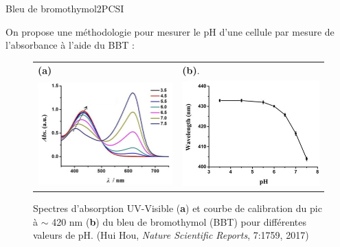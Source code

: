 \begin{exercise}{Bleu de bromothymol}{2}{PCSI}
\begin{questions}
\begin{EnvUplevel}
   On propose une méthodologie pour mesurer le pH d'une cellule par mesure de l'absorbance à l'aide du BBT :
    \begin{figure}[H]
        \centering
        \begin{tabularx}{\linewidth}{XX}
            \small{\textbf{(a)}} & \small{\textbf{(b)}}. \\
            \includegraphics[width=\linewidth]{chimie/pH/BBT2.png} &
            \includegraphics[width=\linewidth]{chimie/pH/BBT3.png}
        \end{tabularx}\vspace{-.5em}
        \caption{Spectres d'absorption UV-Visible (\textbf{a}) et courbe de calibration du pic à $\sim$ 420 nm (\textbf{b}) du bleu de bromothymol (BBT) pour différentes valeurs de pH. (Hui Hou, \emph{Nature Scientific Reports}, 7:1759, 2017)}
        \label{fig:BBT2}
    \end{figure}
\end{EnvUplevel}\vspace{-2ex}


\end{questions}
\end{exercise}
